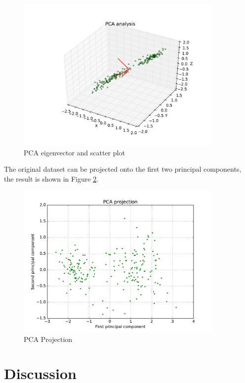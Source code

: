 \begin{figure}[H]
\centering
\includegraphics[width=0.9\textwidth]{./figures/3d.pdf}
\caption{\label{fig:3d} PCA eigenvector and scatter plot}
\end{figure}


The original dataset can be projected onto the first two principal components, the result is shown in Figure \ref{fig:projection}.
\begin{figure}[H]
\centering
\includegraphics[width=0.9\textwidth]{./figures/projection.pdf}
\caption{\label{fig:projection} PCA Projection}
\end{figure}


\section{\large Discussion}

